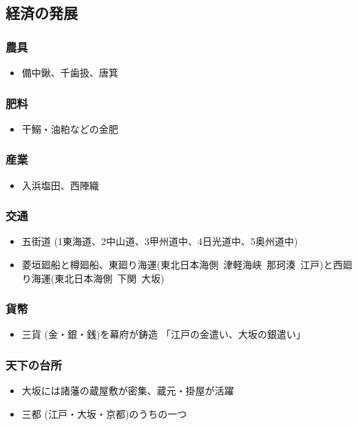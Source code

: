 \documentclass[a4paper,11pt]{jsarticle}
\begin{document}
\subsection*{経済の発展}
\subsubsection*{農具}
\begin{itemize}
  \item 備中鍬、千歯扱、唐箕
\end{itemize}

\subsubsection*{肥料}
\begin{itemize}
  \item 干鰯・油粕などの金肥
\end{itemize}

\subsubsection*{産業}
\begin{itemize}
  \item 入浜塩田、西陣織
\end{itemize}

\subsubsection*{交通}
\begin{itemize}
  \item 五街道 (1東海道、2中山道、3甲州道中、4日光道中、5奥州道中)
  \item 菱垣廻船と樽廻船、東廻り海運(東北日本海側~津軽海峡~那珂湊~江戸)と西廻り海運(東北日本海側~下関~大坂)
\end{itemize}

\subsubsection*{貨幣}
\begin{itemize}
  \item 三貨 (金・銀・銭)を幕府が鋳造 「江戸の金遣い、大坂の銀遣い」
\end{itemize}

\subsubsection*{天下の台所}
\begin{itemize}
  \item 大坂には諸藩の蔵屋敷が密集、蔵元・掛屋が活躍
  \item 三都 (江戸・大坂・京都)のうちの一つ
\end{itemize}
\end{document}

